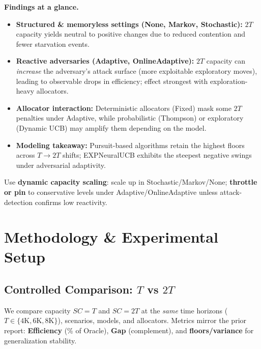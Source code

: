 \documentclass[11pt,a4paper]{article}
\newcommand{\critical}[1]{\textcolor{criticalcolor}{\textbf{#1}}}
\newcommand{\success}[1]{\textcolor{successcolor}{\textbf{#1}}}
\begin{document}
\textbf{Findings at a glance.}
\begin{itemize}
    \item \success{Structured \& memoryless settings (None, Markov, Stochastic):} $2T$ capacity yields neutral to positive changes due to reduced contention and fewer starvation events.
    \item \critical{Reactive adversaries (Adaptive, OnlineAdaptive):} $2T$ capacity can \emph{increase} the adversary's attack surface (more exploitable exploratory moves), leading to observable drops in efficiency; effect strongest with exploration-heavy allocators.
    \item \textbf{Allocator interaction:} Deterministic allocators (Fixed) mask some $2T$ penalties under Adaptive, while probabilistic (Thompson) or exploratory (Dynamic UCB) may amplify them depending on the model.
    \item \textbf{Modeling takeaway:} Pursuit-based algorithms retain the highest floors across $T\!\rightarrow\!2T$ shifts; EXPNeuralUCB exhibits the steepest negative swings under adversarial adaptivity.
\end{itemize}

\begin{tcolorbox}[colback=successcolor!10,colframe=successcolor,title=Deployment Implication]
Use \textbf{dynamic capacity scaling}: scale up in Stochastic/Markov/None; \textbf{throttle or pin} to conservative levels under Adaptive/OnlineAdaptive unless attack-detection confirms low reactivity.
\end{tcolorbox}

\section{Methodology \& Experimental Setup}

\subsection{Controlled Comparison: $T$ vs $2T$}
We compare capacity $SC{=}T$ and $SC{=}2T$ at the \emph{same} time horizons ($T \in \{4\text{K},6\text{K},8\text{K}\}$), scenarios, models, and allocators. Metrics mirror the prior report: \textbf{Efficiency} (\% of Oracle), \textbf{Gap} (complement), and \textbf{floors/variance} for generalization stability.
\end{document}
